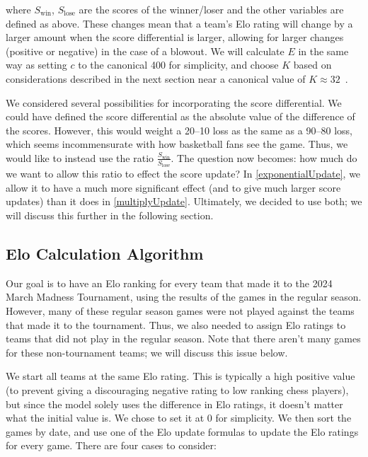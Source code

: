 \documentclass{article}
\begin{document}
where $S_{\text{win}}$, $S_{\text{lose}}$ are the scores of the winner/loser and the other variables are defined as above. These changes mean that a team's Elo rating will change by a larger amount when the score differential is larger, allowing for larger changes (positive or negative) in the case of a blowout. We will calculate $E$ in the same way as setting $c$ to the canonical 400 for simplicity, and choose $K$ based on considerations described in the next section near a canonical value  of $K\approx 32$~\cite{mediumRatingSystem}.

We considered several possibilities for incorporating the score differential. We could have defined the score differential as the absolute value of the difference of the scores. However, this would weight a 20--10 loss as the same as a 90--80 loss, which seems incommensurate with how basketball fans see the game. Thus, we would like to instead use the ratio $\frac{S_{\text{win}}}{S_{\text{lose}}}$. The question now becomes: how much do we want to allow this ratio to effect the score update? In \autoref{exponentialUpdate}, we allow it to have a much more significant effect (and to give much larger score updates) than it does in \autoref{multiplyUpdate}. Ultimately, we decided to use both; we will discuss this further in the following section.

\subsection{Elo Calculation Algorithm}
Our goal is to have an Elo ranking for every team that made it to the 2024 March Madness Tournament, using the results of the games in the regular season. However, many of these regular season games were not played against the teams that made it to the tournament. Thus, we also needed to assign Elo ratings to teams that did not play in the regular season. Note that there aren't many games for these non-tournament teams; we will discuss this issue below. 

We start all teams at the same Elo rating. This is typically a high positive value (to prevent giving a discouraging negative rating to low ranking chess players), but since the model solely uses the difference in Elo ratings, it doesn't matter what the initial value is. We chose to set it at 0 for simplicity. We then sort the games by date, and use one of the Elo update formulas to update the Elo ratings for every game. There are four cases to consider:
\end{document}
